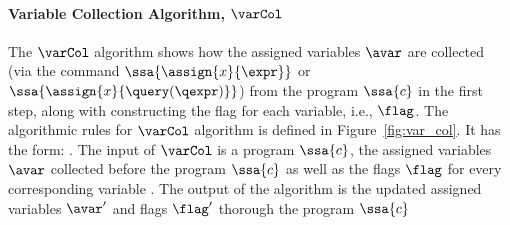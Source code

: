 \paragraph{Variable Collection Algorithm, $\varCol$}
The $\varCol$ algorithm shows how the assigned variables $\avar$ are collected 
(via the command $\ssa{\assign{x}{\expr}}$ or $\ssa{\assign{x}{\query(\qexpr)}}$) from the program $\ssa{c}$ in the first step, 
along with constructing the flag for each variable, i.e., $\flag$.
The algorithmic rules for $\varCol$ algorithm is defined in Figure~\ref{fig:var_col}. 
It has the form: 
. 
The input of $\varCol$ is a program $\ssa{c}$, 
the assigned variables $\avar$ collected before the program $\ssa{c}$ 
as well as the flags $\flag$ for every corresponding variable .
The output of the algorithm is the updated assigned variables $\avar'$ and flags $\flag'$ thorough the program $\ssa{c}$
%
%
